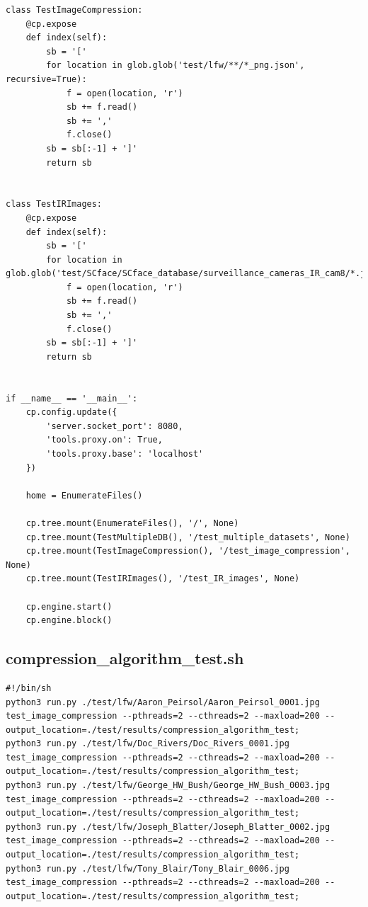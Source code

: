 \documentclass[12pt]{article}
\begin{document}
\begin{appendices}
\begin{lstlisting}
class TestImageCompression:
    @cp.expose
    def index(self):
        sb = '['
        for location in glob.glob('test/lfw/**/*_png.json', recursive=True):
            f = open(location, 'r')
            sb += f.read()
            sb += ','
            f.close()
        sb = sb[:-1] + ']'
        return sb


class TestIRImages:
    @cp.expose
    def index(self):
        sb = '['
        for location in glob.glob('test/SCface/SCface_database/surveillance_cameras_IR_cam8/*.json'):
            f = open(location, 'r')
            sb += f.read()
            sb += ','
            f.close()
        sb = sb[:-1] + ']'
        return sb


if __name__ == '__main__':
    cp.config.update({
        'server.socket_port': 8080,
        'tools.proxy.on': True,
        'tools.proxy.base': 'localhost'
    })

    home = EnumerateFiles()

    cp.tree.mount(EnumerateFiles(), '/', None)
    cp.tree.mount(TestMultipleDB(), '/test_multiple_datasets', None)
    cp.tree.mount(TestImageCompression(), '/test_image_compression', None)
    cp.tree.mount(TestIRImages(), '/test_IR_images', None)

    cp.engine.start()
    cp.engine.block()

\end{lstlisting}

\subsection{compression\_algorithm\_test.sh}
\begin{lstlisting}
#!/bin/sh
python3 run.py ./test/lfw/Aaron_Peirsol/Aaron_Peirsol_0001.jpg test_image_compression --pthreads=2 --cthreads=2 --maxload=200 --output_location=./test/results/compression_algorithm_test;
python3 run.py ./test/lfw/Doc_Rivers/Doc_Rivers_0001.jpg test_image_compression --pthreads=2 --cthreads=2 --maxload=200 --output_location=./test/results/compression_algorithm_test;
python3 run.py ./test/lfw/George_HW_Bush/George_HW_Bush_0003.jpg test_image_compression --pthreads=2 --cthreads=2 --maxload=200 --output_location=./test/results/compression_algorithm_test;
python3 run.py ./test/lfw/Joseph_Blatter/Joseph_Blatter_0002.jpg test_image_compression --pthreads=2 --cthreads=2 --maxload=200 --output_location=./test/results/compression_algorithm_test;
python3 run.py ./test/lfw/Tony_Blair/Tony_Blair_0006.jpg test_image_compression --pthreads=2 --cthreads=2 --maxload=200 --output_location=./test/results/compression_algorithm_test;
\end{lstlisting}


\end{appendices}
\end{document}
